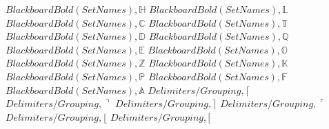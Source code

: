 \documentclass{article}
\begin{document}
\linebreak
$Blackboard Bold (Set Names),\mathbb{H}$
\linebreak
\linebreak
$Blackboard Bold (Set Names),\mathbb{L}$
\linebreak
\linebreak
$Blackboard Bold (Set Names),\mathbb{C}$
\linebreak
\linebreak
$Blackboard Bold (Set Names),\mathbb{T}$
\linebreak
\linebreak
$Blackboard Bold (Set Names),\mathbb{D}$
\linebreak
\linebreak
$Blackboard Bold (Set Names),\mathbb{Q}$
\linebreak
\linebreak
$Blackboard Bold (Set Names),\mathbb{E}$
\linebreak
\linebreak
$Blackboard Bold (Set Names),\mathbb{O}$
\linebreak
\linebreak
$Blackboard Bold (Set Names),\mathbb{Z}$
\linebreak
\linebreak
$Blackboard Bold (Set Names),\mathbb{K}$
\linebreak
\linebreak
$Blackboard Bold (Set Names),\mathbb{P}$
\linebreak
\linebreak
$Blackboard Bold (Set Names),\mathbb{F}$
\linebreak
\linebreak
$Blackboard Bold (Set Names),\mathbb{A}$
\linebreak
\linebreak
$Delimiters/Grouping,\lceil$
\linebreak
\linebreak
$Delimiters/Grouping,\urcorner$
\linebreak
\linebreak
$Delimiters/Grouping,\rceil$
\linebreak
\linebreak
$Delimiters/Grouping,\ulcorner$
\linebreak
\linebreak
$Delimiters/Grouping,\lfloor$
\linebreak
\linebreak
$Delimiters/Grouping,[$
\linebreak
\end{document}
